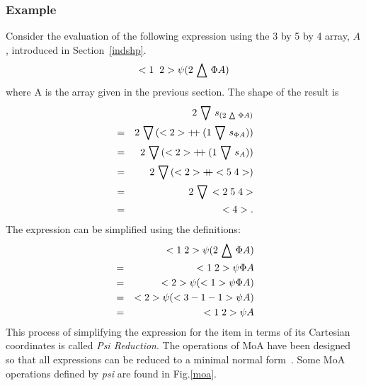 \subsubsection*{Example}
Consider the evaluation of the following expression using the
3 by 5 by 4 array, $A$, introduced in Section~\ref{indshp}.
\begin{eqnarray}
             <1\;\; 2> \psi (2 \,\bigtriangleup\, \Phi A) 
\end{eqnarray}
where A is the array given in the previous section.
The shape of the result is 
\begin{eqnarray}
                & &  2 \drop s_{(2 \take \Phi A)} \nonumber \\
                & = & 2 \drop (<2> \cat (1 \drop s_{\Phi A} )) \nonumber \\
               & = & 2 \drop (<2> \cat (1 \drop s_A)) \nonumber \\
               & = & 2 \drop (<2> \cat <5\; 4>) \nonumber \\
               & = & 2 \drop <2\; 5 \;4> \nonumber \\
              &  = &<4> . 
\end{eqnarray}
The expression can be simplified using the definitions:
\begin{eqnarray}
          &&   <1\; 2> \psi (2 \,\bigtriangleup\, \Phi A) \nonumber \\
           & = &  <1 \; 2> \psi \Phi A \nonumber \\
         &   = & <2> \psi (<1> \psi \Phi A) \nonumber \\
         &  = & <2> \psi (<3 - 1 - 1 > \psi A) \nonumber \\
        &   = & <1 \; 2> \psi A  \nonumber \\
\end{eqnarray}
This process of simplifying the expression for the item in terms of
its Cartesian coordinates is called {\em Psi Reduction}. The operations of MoA
have been designed so that all expressions can be reduced to a minimal
normal form~\cite{mul88}.
Some MoA operations defined by {\em psi} are found in Fig.\ref{moa}.

